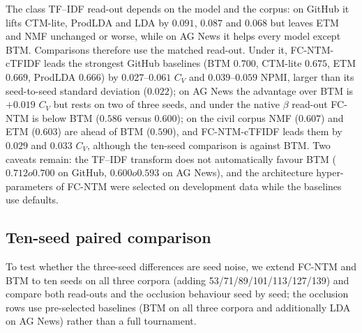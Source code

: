 \documentclass[11pt]{article}
\newcommand{\fcntm}{FC-NTM}
\begin{document}
The class TF--IDF read-out depends on the model and the corpus: on GitHub it lifts CTM-lite,
ProdLDA and LDA by $0.091$, $0.087$ and $0.068$ but leaves ETM and NMF unchanged or worse, while on
AG News it helps every model except BTM. Comparisons therefore use the matched read-out. Under it,
\fcntm{}-cTFIDF leads the strongest GitHub baselines (BTM $0.700$, CTM-lite $0.675$, ETM $0.669$,
ProdLDA $0.666$) by $0.027$--$0.061$ $C_V$ and $0.039$--$0.059$ NPMI, larger than its seed-to-seed
standard deviation ($0.022$); on AG News the advantage over BTM is $+0.019$ $C_V$ but rests on two
of three seeds, and under the native $\beta$ read-out \fcntm{} is below BTM ($0.586$ versus
$0.600$); on the civil corpus NMF ($0.607$) and ETM ($0.603$) are ahead of BTM ($0.590$), and
\fcntm{}-cTFIDF leads them by $0.029$ and $0.033$ $C_V$, although the ten-seed comparison is
against BTM. Two caveats remain: the TF--IDF transform does not automatically favour BTM
($0.712	o0.700$ on GitHub, $0.600	o0.593$ on AG News), and the architecture hyper-parameters
of \fcntm{} were selected on development data while the baselines use defaults.

\subsection{Ten-seed paired comparison}

To test whether the three-seed differences are seed noise, we extend \fcntm{} and BTM to ten seeds
on all three corpora (adding 53/71/89/101/113/127/139) and compare both read-outs and the
occlusion behaviour seed by seed; the occlusion rows use pre-selected baselines (BTM on all three
corpora and additionally LDA on AG News) rather than a full tournament.
\end{document}
